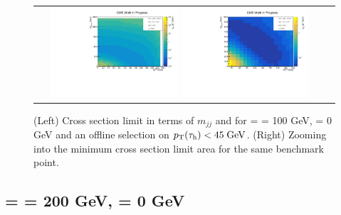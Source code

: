 \begin{figure}[tbh!]
	\centering
	\begin{tabular}{cc}
		\includegraphics[width=0.45\textwidth]{analysis/pics/JetInvMass_vs_MET_xsec_chi100_lsp000_taupt45.pdf}
		\includegraphics[width=0.45\textwidth]{analysis/pics/JetInvMass_vs_MET_xsec_chi100_lsp000_taupt45_zoom.pdf} 		
	\end{tabular}
	\caption{(Left) Cross section limit in terms of $m_{jj}$ and \met for \charginopm = \neutralinotwo = 100 GeV, \neutralinoone = 0 GeV and an offline selection on $p_{\text{T}}(\tau_{\text{h}}) <  45\;\text{Ge}\kern-0.06667em\text{V}$. (Right) Zooming into the minimum cross section limit area for the same benchmark point.}
	\label{fig::JetInvMass_vs_MET_xsec_chi100_lsp000_taupt45}
\end{figure}

\clearpage

\subsection*{\charginopm = \neutralinotwo = 200 GeV, \neutralinoone = 0 GeV}

